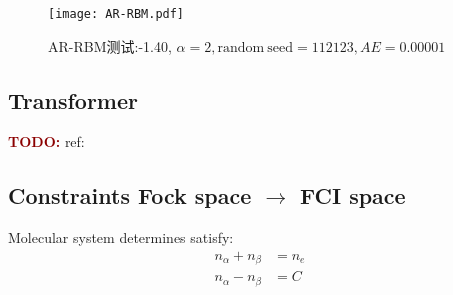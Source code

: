 \begin{figure}[htp]
    \centering
    \texttt{[image: AR-RBM.pdf]}
    \caption{AR-RBM测试:-1.40, $\alpha = 2, \mathrm{random\ seed} = 112123, AE= 0.00001$}
\end{figure}

\subsection{Transformer}
\textcolor{darkred}{\textbf{TODO:}} ref:\cite{zhang2023transformer,wu2023nnqs}

\subsection{Constraints Fock space \texorpdfstring{$\rightarrow$}{→} FCI space}

Molecular system determines satisfy:
\begin{equation}
    \begin{split}
    n_{\alpha} + n_{\beta} & = n_e \\
    n_{\alpha} - n_{\beta} & = C \\
    \end{split}
\end{equation}

